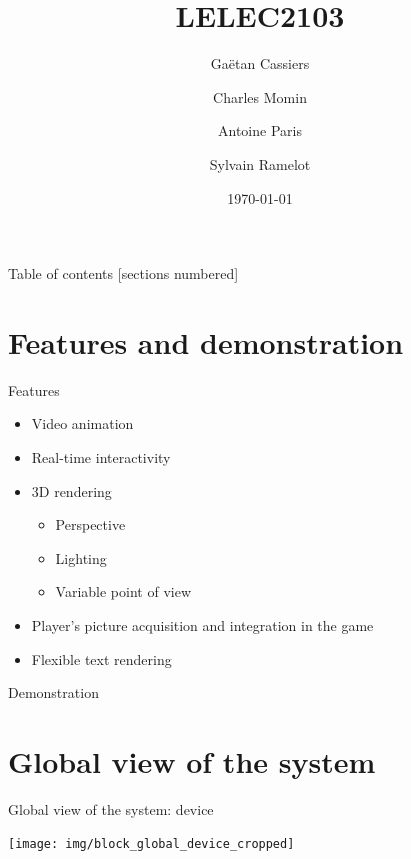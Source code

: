 \documentclass[10pt]{beamer}
\title{LELEC2103}
\subtitle{}
\date{\today}
\author{Gaëtan Cassiers\and Charles Momin \and Antoine Paris \and Sylvain Ramelot}
\institute{Ecole polytechnique de Louvain}
\begin{document}
\maketitle
{}

\begin{frame}{Table of contents}
  [sections numbered]
  \tableofcontents%
\end{frame}


\section{Features and demonstration}
\begin{frame}{Features}
    \begin{itemize}
        \item Video animation
        \item Real-time interactivity
        \item 3D rendering
        \begin{itemize}
            \item Perspective
            \item Lighting
            \item Variable point of view
        \end{itemize}
        \item Player's picture acquisition and integration in the game
        \item Flexible text rendering
    \end{itemize}
\end{frame}

\begin{frame}{Demonstration}

\end{frame}

\section{Global view of the system}
\begin{frame}{Global view of the system: device}
    \begin{center}
        \texttt{[image: img/block\_global\_device\_cropped]}
    \end{center}
\end{frame}
\end{document}
